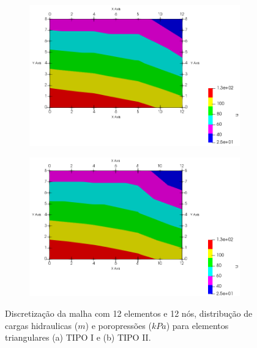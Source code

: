 \documentclass{article} %
\begin{document}
\begin{figure}[H]
\begin{subfigure}[b]{0.49\textwidth}
	\includegraphics[width=\textwidth]{option1_au}
	\caption{}
	\label{}
\end{subfigure}
	\begin{subfigure}[b]{0.49\textwidth}
	\includegraphics[width=\textwidth]{option2_au}
	\caption{}
	\label{}
\end{subfigure}
	\caption{Discretização da malha com 12 elementos e 12 nós, distribução de cargas hidraulicas (\(m\)) e poropressões (\(kPa\)) para elementos triangulares (a) TIPO I e (b) TIPO II.}\label{}
\end{figure}
\end{document}
